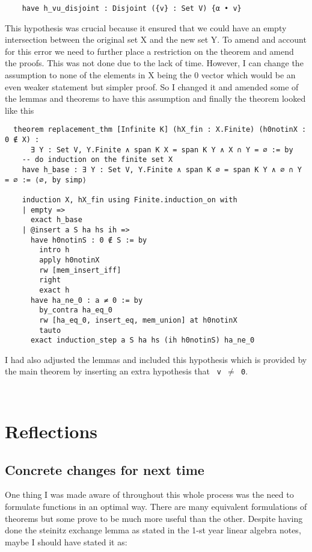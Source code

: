 \documentclass{article}
\begin{document}
\begin{lstlisting}
    have h_vu_disjoint : Disjoint ({v} : Set V) {α • v}
\end{lstlisting}

This hypothesis was crucial because it ensured that we could have an empty intersection between the original set X and the new set Y. To amend and account for this error we need to further place a restriction on the theorem and amend the proofs. This was not done due to the lack of time. However, I can change the assumption to none of the elements in X being the 0 vector which would be an even weaker statement but simpler proof. So I changed it and amended some of the lemmas and theorems to have this assumption and finally the theorem looked like this

\begin{lstlisting}
  theorem replacement_thm [Infinite K] (hX_fin : X.Finite) (h0notinX : 0 ∉ X) :
      ∃ Y : Set V, Y.Finite ∧ span K X = span K Y ∧ X ∩ Y = ∅ := by
    -- do induction on the finite set X
    have h_base : ∃ Y : Set V, Y.Finite ∧ span K ∅ = span K Y ∧ ∅ ∩ Y = ∅ := ⟨∅, by simp⟩

    induction X, hX_fin using Finite.induction_on with
    | empty =>
      exact h_base
    | @insert a S ha hs ih =>
      have h0notinS : 0 ∉ S := by
        intro h
        apply h0notinX
        rw [mem_insert_iff]
        right
        exact h
      have ha_ne_0 : a ≠ 0 := by
        by_contra ha_eq_0
        rw [ha_eq_0, insert_eq, mem_union] at h0notinX
        tauto
      exact induction_step a S ha hs (ih h0notinS) ha_ne_0
\end{lstlisting}

I had also adjusted the lemmas and included this hypothesis which is provided by the main theorem by inserting an extra hypothesis that \texttt{ v $\neq$ 0}.

\begin{lstlisting}
    
\end{lstlisting}

\section{Reflections}

\subsection{Concrete changes for next time}

One thing I was made aware of throughout this whole process was the need to formulate functions in an optimal way. There are many equivalent formulations of  theorems but some prove to be much more useful than the other. Despite having done the steinitz exchange lemma as stated in the 1-st year linear algebra notes, maybe I should have stated it as:
\end{document}
